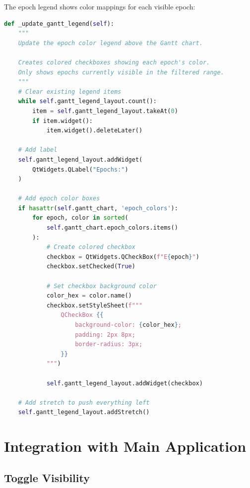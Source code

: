\documentclass[11pt,a4paper]{article}
\begin{document}
The epoch legend shows color mappings for each visible epoch:

\begin{lstlisting}[language=Python]
def _update_gantt_legend(self):
    """
    Update the epoch color legend above the Gantt chart.
    
    Creates colored checkboxes showing each epoch's color.
    Only shows epochs currently visible in the filtered range.
    """
    # Clear existing legend items
    while self.gantt_legend_layout.count():
        item = self.gantt_legend_layout.takeAt(0)
        if item.widget():
            item.widget().deleteLater()
    
    # Add label
    self.gantt_legend_layout.addWidget(
        QtWidgets.QLabel("Epochs:")
    )
    
    # Add epoch color boxes
    if hasattr(self.gantt_chart, 'epoch_colors'):
        for epoch, color in sorted(
            self.gantt_chart.epoch_colors.items()
        ):
            # Create colored checkbox
            checkbox = QtWidgets.QCheckBox(f"E{epoch}")
            checkbox.setChecked(True)
            
            # Set checkbox background color
            color_hex = color.name()
            checkbox.setStyleSheet(f"""
                QCheckBox {{
                    background-color: {color_hex};
                    padding: 2px 8px;
                    border-radius: 3px;
                }}
            """)
            
            self.gantt_legend_layout.addWidget(checkbox)
    
    # Add stretch to push everything left
    self.gantt_legend_layout.addStretch()
\end{lstlisting}

\section{Integration with Main Application}

\subsection{Toggle Visibility}
\end{document}

